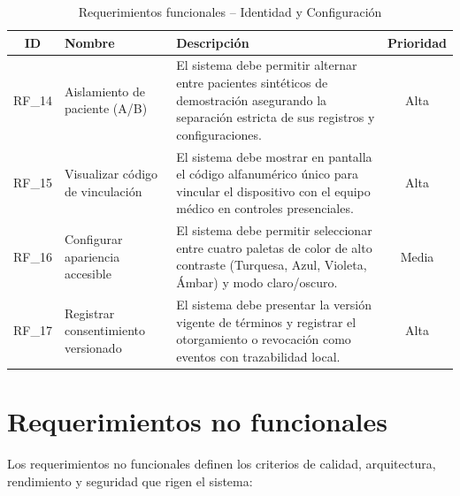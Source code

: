 \begin{table}[H]
\centering
\renewcommand{\arraystretch}{1.3}
\setlength{\tabcolsep}{6pt}
\begin{tabularx}{\textwidth}{|c|p{3.5cm}|X|c|}
\hline
\textbf{ID} & \textbf{Nombre} & \textbf{Descripción} & \textbf{Prioridad} \\ \hline
RF\_14 & Aislamiento de paciente (A/B) & El sistema debe permitir alternar entre pacientes sintéticos de demostración asegurando la separación estricta de sus registros y configuraciones. & Alta \\ \hline
RF\_15 & Visualizar código de vinculación & El sistema debe mostrar en pantalla el código alfanumérico único para vincular el dispositivo con el equipo médico en controles presenciales. & Alta \\ \hline
RF\_16 & Configurar apariencia accesible & El sistema debe permitir seleccionar entre cuatro paletas de color de alto contraste (Turquesa, Azul, Violeta, Ámbar) y modo claro/oscuro. & Media \\ \hline
RF\_17 & Registrar consentimiento versionado & El sistema debe presentar la versión vigente de términos y registrar el otorgamiento o revocación como eventos con trazabilidad local. & Alta \\ \hline
\end{tabularx}
\caption{Requerimientos funcionales – Identidad y Configuración}
\label{tab:rf_identidad}
\end{table}

\section{Requerimientos no funcionales}

Los requerimientos no funcionales definen los criterios de calidad, arquitectura, rendimiento y seguridad que rigen el sistema:

